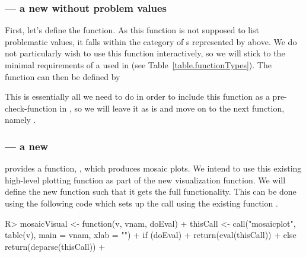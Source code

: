 \documentclass[article,shortnames]{jss}
\begin{document}
\subsubsection[isID --- a new checkFunction without problem values]{ --- a new  without problem values}
First, let's define the  function. As this function is
not supposed to list problematic values, it falls within the category
of s represented by
 above. We do not particularly wish to
use this function interactively, so we will stick to the minimal
requirements of a  used in  (see
Table~\ref{table.functionTypes}). The function can then be defined by

\begin{Schunk}
\end{Schunk}

This is essentially all we need to do in order to include this
function as a pre-check-function in , so we will leave it as
is and move on to the next function, namely .

\subsubsection[mosaicVisual --- a new visualFunction]{ --- a new }
 provides a function, , which produces
mosaic plots. We intend to use this existing high-level plotting
function as part of the new visualization function.  We will define
the new function such that it gets the full 
functionality. This can be done using the following code which sets up
the call using the existing function .

\begin{Schunk}
\begin{Sinput}
R> mosaicVisual <- function(v, vnam, doEval) {
+    thisCall <- call("mosaicplot", table(v), main = vnam, xlab = "")
+    if (doEval) {
+      return(eval(thisCall))
+    } else return(deparse(thisCall))
+  }
\end{Sinput}
\end{Schunk}
\end{document}
